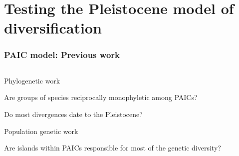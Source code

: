 \begin{frame}
\begin{columns}[c]
    \end{columns}
\end{frame}

\section{Testing the Pleistocene model of diversification}

\begin{frame}
    \frametitle{PAIC model: Previous work}
    \begin{columns}[c]
            \begin{myitemize}
            \item Phylogenetic work
                \begin{myitemize}
                \item Are groups of species reciprocally monophyletic among
                    PAICs?
                \item Do most divergences date to the Pleistocene?
                \end{myitemize}
            \item Population genetic work
                \begin{myitemize}
                \item Are islands within PAICs responsible for most of the
                    genetic diversity?
                \end{myitemize}
            \end{myitemize}


\end{columns}
\end{frame}

